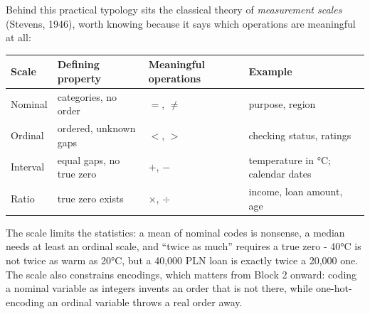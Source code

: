 \documentclass[11pt,a4paper]{article}
\begin{document}
Behind this practical typology sits the classical theory of
\emph{measurement scales} (Stevens, 1946), worth knowing because it says
which operations are meaningful at all:

\begin{center}\small
\begin{tabular}{@{}lllp{3.6cm}@{}}
\toprule
Scale & Defining property & Meaningful operations & Example \\
\midrule
Nominal & categories, no order & $=$, $\neq$ & purpose, region \\
Ordinal & ordered, unknown gaps & $<$, $>$ & checking status, ratings \\
Interval & equal gaps, no true zero & $+$, $-$ & temperature in °C; calendar dates \\
Ratio & true zero exists & $\times$, $\div$ & income, loan amount, age \\
\bottomrule
\end{tabular}
\end{center}

The scale limits the statistics: a mean of nominal codes is nonsense, a
median needs at least an ordinal scale, and ``twice as much'' requires a
true zero - 40°C is not twice as warm as 20°C, but a 40{,}000 PLN loan is
exactly twice a 20{,}000 one. The scale also constrains encodings, which
matters from Block 2 onward: coding a nominal variable as integers invents
an order that is not there, while one-hot-encoding an ordinal variable
throws a real order away.
\end{document}
